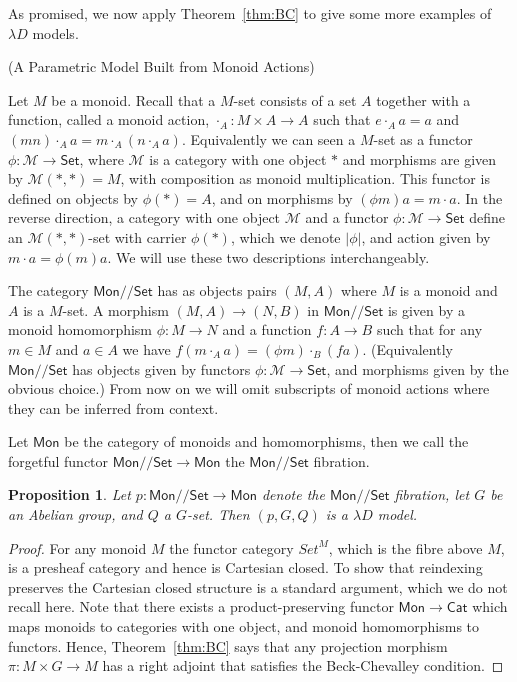 \documentclass[a4paper,UKenglish]{lipics}
\newtheorem{proposition}[theorem]{Proposition}
\newcommand{\msf}[1]{\mathsf{#1}} %
\newcommand{\Mon}{\msf{Mon}}
\newcommand{\Set}{\msf{Set}}
\newcommand{\Cat}{\msf{Cat}}
\newcommand{\GroupSet}[1]{#1/\!/\Set}
\newcommand{\MonSet}{\GroupSet{\Mon}}
\begin{document}
As promised, we now apply Theorem~\ref{thm:BC} to give some more examples of $\lambda D$ models.

\begin{example}(A Parametric Model Built from Monoid Actions)
\label{ex:MonAct}

Let $M$ be a monoid. Recall that a $M$-set consists of a set $A$ together with a function, called a monoid action, $\cdot_A:M\times A\to A$ such that $e\cdot_{A} a=a$ and $(mn)\cdot_A a=m\cdot_A (n\cdot_A a)$. Equivalently we can seen a $M$-set as a functor $\phi : \mathcal{M}\rightarrow \Set$, where $\mathcal{M}$ is a category with one object $\ast$ and morphisms are given by $\mathcal{M}(\ast, \ast) = M$, with composition as monoid multiplication. This functor is defined on objects by $\phi(\ast) = A$, and on morphisms by $(\phi m) a = m \cdot a$. In the reverse direction, a category with one object $\mathcal{M}$ and a functor $\phi : \mathcal{M} \rightarrow \Set$ define an $\mathcal{M}(\ast,\ast)$-set with carrier $\phi(\ast)$, which we denote $|\phi|$, and action given by $m \cdot a = \phi(m)a$. We will use these two descriptions interchangeably.

The category $\MonSet$ has as objects pairs $(M,A)$ where $M$ is a monoid and $A$ is a $M$-set. A morphism $(M,A) \rightarrow (N,B)$ in $\MonSet$ is given by a monoid homomorphism $\phi:M\rightarrow N$ and a function $f:A \rightarrow B$ such that for any $m\in M$ and $a\in A$ we have $f (m\cdot_A a) = (\phi m)\cdot_B (f a)$. (Equivalently $\MonSet$ has objects given by functors $\phi : \mathcal{M} \rightarrow \Set$, and morphisms given by the obvious choice.) From now on we will omit subscripts of monoid actions where they can be inferred from context.

Let $\Mon$ be the category of monoids and homomorphisms, then we call the forgetful functor $\MonSet\to \Mon$ the $\MonSet$ fibration.

\begin{proposition}
Let $p:\MonSet \rightarrow \Mon$ denote the $\MonSet$ fibration, let $G$ be an Abelian group, and $Q$ a $G$-set. Then $(p,G,Q)$ is a $\lambda D$ model.
\end{proposition}

\begin{proof}
For any monoid $M$ the functor category ${Set}^M$, which is the fibre above $M$, is a presheaf category and hence is Cartesian closed. To show that reindexing preserves the Cartesian closed structure is a standard argument, which we do not recall here. Note that there exists a product-preserving functor $\Mon \rightarrow \Cat$ which maps monoids to categories with one object, and monoid homomorphisms to functors. Hence, Theorem~\ref{thm:BC} says that any projection morphism $\pi : M \times G \rightarrow M$ has a right adjoint that satisfies the Beck-Chevalley condition.


\end{proof}
\end{example}
\end{document}
